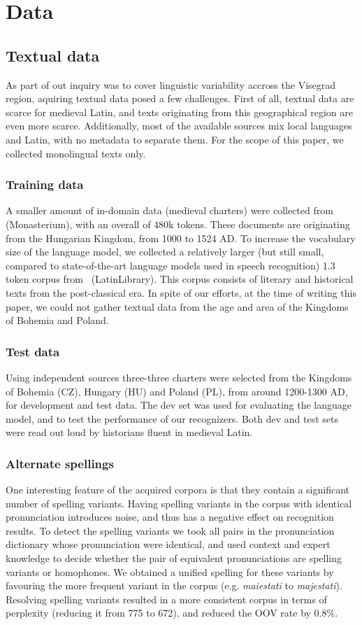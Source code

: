 \documentclass[runningheads,a4paper]{llncs}
\begin{document}
\section{Data}
\subsection{Textual data}\label{text}
As part of out inquiry was to cover linguistic variability accross the Visegrad region, aquiring textual data posed a few challenges.
First of all, textual data are scarce for medieval Latin, and texts originating from this geographical region are even more scarce.
Additionally, most of the available sources mix local languages and Latin, with no metadata to separate them.
For the scope of this paper, we collected monolingual texts only.
\subsubsection{Training data}
A smaller amount of in-domain data (medieval charters) were collected from~\cite{monasterium} (Monasterium), with an overall of 480k tokens.
These documents are originating from the Hungarian Kingdom, from 1000 to 1524 AD.
To increase the vocabulary size of the language model, we collected a relatively larger (but still small, compared to state-of-the-art language models used in speech recognition) 1.3 token corpus from~\cite{latinlibrary} (LatinLibrary).
This corpus consists of literary and historical texts from the post-classical era.
In spite of our efforts, at the time of writing this paper, we could not gather textual data from the age and area of the Kingdoms of Bohemia and Poland.
\subsubsection{Test data}\label{textest}
Using independent sources three-three charters were selected from the Kingdoms of Bohemia (CZ), Hungary (HU) and Poland (PL), from around 1200-1300 AD, for development and test data.
The dev set was used for evaluating the language model, and to test the performance of our recognizers.
Both dev and test sets were read out loud by historians fluent in medieval Latin.
\subsubsection{Alternate spellings}
One interesting feature of the acquired corpora is that they contain a significant number of spelling variants.
Having spelling variants in the corpus with identical pronunciation introduces noise, and thus has a negative effect on recognition results.
To detect the spelling variants we took all pairs in the pronunciation dictionary whose pronunciation were identical, and used context and expert knowledge to decide whether the pair of equivalent pronunciations are spelling variants or homophones.
We obtained a unified spelling for these variants by favouring the more frequent variant in the corpus (e.g. \textit{maiestati} to \textit{majestati}).
Resolving spelling variants resulted in a more consistent corpus in terms of perplexity (reducing it from 775 to 672), and reduced the OOV rate by 0.8\%.
\end{document}

